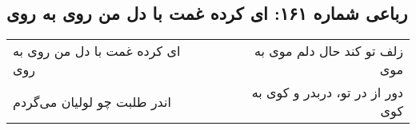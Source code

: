 \begin{center}
\section*{رباعی شماره ۱۶۱: ای کرده غمت با دل من روی به روی}
\label{sec:161}
\begin{longtable}{l p{0.5cm} r}
ای کرده غمت با دل من روی به روی
&&
زلف تو کند حال دلم موی به موی
\\
اندر طلبت چو لولیان می‌گردم
&&
دور از در تو، دربدر و کوی به کوی
\\
\end{longtable}
\end{center}
